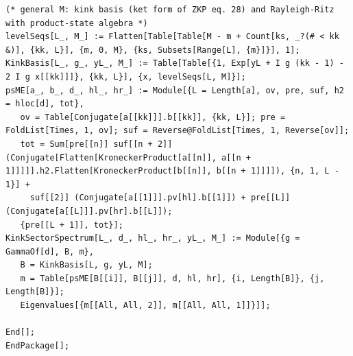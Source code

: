 \documentclass[11pt,a4paper]{article}
\theoremstyle{definition}
\begin{document}
\begin{lstlisting}
(* general M: kink basis (ket form of ZKP eq. 28) and Rayleigh-Ritz with product-state algebra *)
levelSeqs[L_, M_] := Flatten[Table[Table[M - m + Count[ks, _?(# < kk &)], {kk, L}], {m, 0, M}, {ks, Subsets[Range[L], {m}]}], 1];
KinkBasis[L_, g_, yL_, M_] := Table[Table[{1, Exp[yL + I g (kk - 1) - 2 I g x[[kk]]]}, {kk, L}], {x, levelSeqs[L, M]}];
psME[a_, b_, d_, hl_, hr_] := Module[{L = Length[a], ov, pre, suf, h2 = hloc[d], tot},
   ov = Table[Conjugate[a[[kk]]].b[[kk]], {kk, L}]; pre = FoldList[Times, 1, ov]; suf = Reverse@FoldList[Times, 1, Reverse[ov]];
   tot = Sum[pre[[n]] suf[[n + 2]] (Conjugate[Flatten[KroneckerProduct[a[[n]], a[[n + 1]]]]].h2.Flatten[KroneckerProduct[b[[n]], b[[n + 1]]]]), {n, 1, L - 1}] +
     suf[[2]] (Conjugate[a[[1]]].pv[hl].b[[1]]) + pre[[L]] (Conjugate[a[[L]]].pv[hr].b[[L]]);
   {pre[[L + 1]], tot}];
KinkSectorSpectrum[L_, d_, hl_, hr_, yL_, M_] := Module[{g = GammaOf[d], B, m},
   B = KinkBasis[L, g, yL, M];
   m = Table[psME[B[[i]], B[[j]], d, hl, hr], {i, Length[B]}, {j, Length[B]}];
   Eigenvalues[{m[[All, All, 2]], m[[All, All, 1]]}]];

End[];
EndPackage[];
\end{lstlisting}
\end{document}
